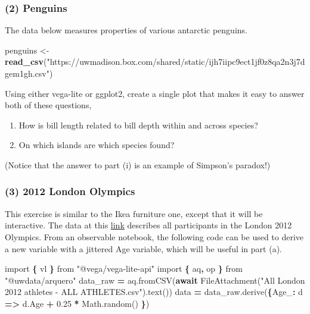\documentclass[
]{article}
\newenvironment{Shaded}{\begin{snugshade}}{\end{snugshade}}
\newcommand{\AttributeTok}[1]{\textcolor[rgb]{0.77,0.63,0.00}{#1}}
\newcommand{\ControlFlowTok}[1]{\textcolor[rgb]{0.13,0.29,0.53}{\textbf{#1}}}
\newcommand{\DataTypeTok}[1]{\textcolor[rgb]{0.13,0.29,0.53}{#1}}
\newcommand{\FloatTok}[1]{\textcolor[rgb]{0.00,0.00,0.81}{#1}}
\newcommand{\ImportTok}[1]{#1}
\newcommand{\KeywordTok}[1]{\textcolor[rgb]{0.13,0.29,0.53}{\textbf{#1}}}
\newcommand{\NormalTok}[1]{#1}
\newcommand{\OperatorTok}[1]{\textcolor[rgb]{0.81,0.36,0.00}{\textbf{#1}}}
\newcommand{\StringTok}[1]{\textcolor[rgb]{0.31,0.60,0.02}{#1}}
\newcommand{\VariableTok}[1]{\textcolor[rgb]{0.00,0.00,0.00}{#1}}
\providecommand{\tightlist}{%
  \setlength{\itemsep}{0pt}\setlength{\parskip}{0pt}}
\begin{document}
\hypertarget{penguins}{%
\subsubsection{(2) Penguins}\label{penguins}}

The data below measures properties of various antarctic penguins.

\begin{Shaded}
\begin{Highlighting}[]
\NormalTok{penguins <-}\StringTok{ }\KeywordTok{read_csv}\NormalTok{(}\StringTok{"https://uwmadison.box.com/shared/static/ijh7iipc9ect1jf0z8qa2n3j7dgem1gh.csv"}\NormalTok{)}
\end{Highlighting}
\end{Shaded}

Using either vega-lite or ggplot2, create a single plot that makes it
easy to answer both of these questions,

\begin{enumerate}
\def\labelenumi{\roman{enumi})}
\tightlist
\item
  How is bill length related to bill depth within and across species?
\item
  On which islands are which species found?
\end{enumerate}

(Notice that the answer to part (i) is an example of Simpson's paradox!)

\hypertarget{london-olympics}{%
\subsubsection{(3) 2012 London Olympics}\label{london-olympics}}

This exercise is similar to the Ikea furniture one, except that it will
be interactive. The data at this
\href{https://uwmadison.box.com/s/rzw8h2x6dp5693gdbpgxaf2koqijo12l}{link}
describes all participants in the London 2012 Olympics. From an
observable notebook, the following code can be used to derive a new
variable with a jittered Age variable, which will be useful in part (a).

\begin{Shaded}
\begin{Highlighting}[]
\ImportTok{import} \OperatorTok{\{}\NormalTok{ vl }\OperatorTok{\}} \ImportTok{from} \StringTok{"@vega/vega-lite-api"}
\ImportTok{import} \OperatorTok{\{}\NormalTok{ aq}\OperatorTok{,}\NormalTok{ op }\OperatorTok{\}} \ImportTok{from} \StringTok{"@uwdata/arquero"}
\NormalTok{data_raw }\OperatorTok{=} \VariableTok{aq}\NormalTok{.}\AttributeTok{fromCSV}\NormalTok{(}\ControlFlowTok{await} \AttributeTok{FileAttachment}\NormalTok{(}\StringTok{"All London 2012 athletes - ALL ATHLETES.csv"}\NormalTok{).}\AttributeTok{text}\NormalTok{())}
\NormalTok{data }\OperatorTok{=} \VariableTok{data_raw}\NormalTok{.}\AttributeTok{derive}\NormalTok{(}\OperatorTok{\{}\DataTypeTok{Age_}\OperatorTok{:}\NormalTok{ d }\KeywordTok{=>} \VariableTok{d}\NormalTok{.}\AttributeTok{Age} \OperatorTok{+} \FloatTok{0.25} \OperatorTok{*} \VariableTok{Math}\NormalTok{.}\AttributeTok{random}\NormalTok{() }\OperatorTok{\}}\NormalTok{)}
\end{Highlighting}
\end{Shaded}
\end{document}
